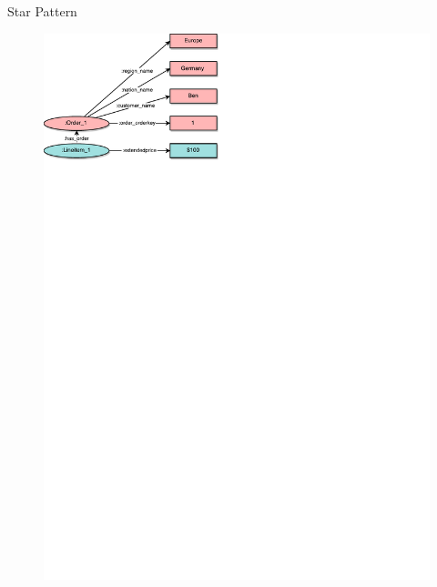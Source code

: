 \section{\patsec}
\begin{frame}{\patsec}{Star Pattern}
    \begin{figure}
        \includegraphics[trim=0 648 255 0,clip,width=1\textwidth]{images/starpattern.pdf}
    \end{figure}
\end{frame}

